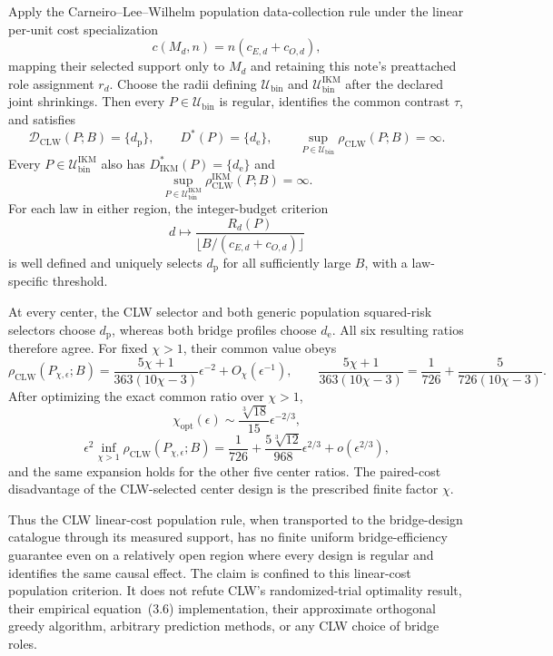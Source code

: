 Apply the Carneiro--Lee--Wilhelm population data-collection rule under the linear per-unit cost specialization
\[
 c(M_d,n)=n(c_{E,d}+c_{O,d}),
\]
mapping their selected support only to \(M_d\) and retaining this note's preattached role assignment \(r_d\). Choose the radii defining \(\mathcal U_{\mathrm{bin}}\) and \(\mathcal U_{\mathrm{bin}}^{\mathrm{IKM}}\) after the declared joint shrinkings. Then every \(P\in\mathcal U_{\mathrm{bin}}\) is regular, identifies the common contrast \(\tau\), and satisfies
\[
 \mathcal D_{\mathrm{CLW}}(P;B)=\{d_{\mathrm p}\},
 \qquad D^*(P)=\{d_{\mathrm e}\},
 \qquad
 \sup_{P\in\mathcal U_{\mathrm{bin}}}\rho_{\mathrm{CLW}}(P;B)=\infty. \tag{1}
\]
Every \(P\in\mathcal U_{\mathrm{bin}}^{\mathrm{IKM}}\) also has \(D_{\mathrm{IKM}}^*(P)=\{d_{\mathrm e}\}\) and
\[
 \sup_{P\in\mathcal U_{\mathrm{bin}}^{\mathrm{IKM}}}
 \rho_{\mathrm{CLW}}^{\mathrm{IKM}}(P;B)=\infty.             \tag{2}
\]
For each law in either region, the integer-budget criterion
\[
 d\longmapsto
 \frac{R_d(P)}{\lfloor B/(c_{E,d}+c_{O,d})\rfloor}
\]
is well defined and uniquely selects \(d_{\mathrm p}\) for all sufficiently large \(B\), with a law-specific threshold.

At every center, the CLW selector and both generic population squared-risk selectors choose \(d_{\mathrm p}\), whereas both bridge profiles choose \(d_{\mathrm e}\). All six resulting ratios therefore agree. For fixed \(\chi>1\), their common value obeys
\[
 \rho_{\mathrm{CLW}}(P_{\chi,\epsilon};B)
 =\frac{5\chi+1}{363(10\chi-3)}\epsilon^{-2}+O_\chi(\epsilon^{-1}),
 \qquad
 \frac{5\chi+1}{363(10\chi-3)}
 =\frac1{726}+\frac5{726(10\chi-3)}.                       \tag{3}
\]
After optimizing the exact common ratio over \(\chi>1\),
\[
 \chi_{\mathrm{opt}}(\epsilon)
 \sim\frac{\sqrt[3]{18}}{15}\epsilon^{-2/3},
\]
\[
 \epsilon^2\inf_{\chi>1}\rho_{\mathrm{CLW}}(P_{\chi,\epsilon};B)
 =\frac1{726}+\frac{5\sqrt[3]{12}}{968}\epsilon^{2/3}
 +o(\epsilon^{2/3}),                                      \tag{4}
\]
and the same expansion holds for the other five center ratios. The paired-cost disadvantage of the CLW-selected center design is the prescribed finite factor \(\chi\).

Thus the CLW linear-cost population rule, when transported to the bridge-design catalogue through its measured support, has no finite uniform bridge-efficiency guarantee even on a relatively open region where every design is regular and identifies the same causal effect. The claim is confined to this linear-cost population criterion. It does not refute CLW's randomized-trial optimality result, their empirical equation~(3.6) implementation, their approximate orthogonal greedy algorithm, arbitrary prediction methods, or any CLW choice of bridge roles.